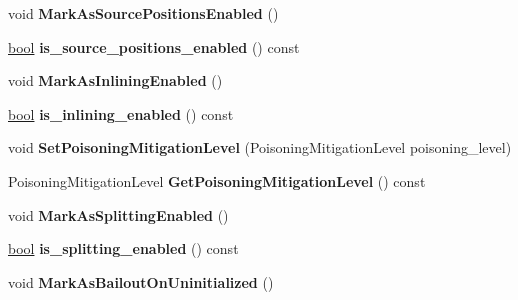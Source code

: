 \begin{DoxyCompactItemize}
void {\bfseries Mark\+As\+Source\+Positions\+Enabled} ()
\item 
\mbox{\label{classv8_1_1internal_1_1OptimizedCompilationInfo_aa2678065d4449bdbdda8e6f4bbad6d94}} 
\mbox{\hyperlink{classbool}{bool}} {\bfseries is\+\_\+source\+\_\+positions\+\_\+enabled} () const
\item 
\mbox{\label{classv8_1_1internal_1_1OptimizedCompilationInfo_a808c670437cd45d6b513de0625e955f2}} 
void {\bfseries Mark\+As\+Inlining\+Enabled} ()
\item 
\mbox{\label{classv8_1_1internal_1_1OptimizedCompilationInfo_af335802333f0660d4f3dd33f4a8811bb}} 
\mbox{\hyperlink{classbool}{bool}} {\bfseries is\+\_\+inlining\+\_\+enabled} () const
\item 
\mbox{\label{classv8_1_1internal_1_1OptimizedCompilationInfo_a2cccd688d4143e0a94428422c4895716}} 
void {\bfseries Set\+Poisoning\+Mitigation\+Level} (Poisoning\+Mitigation\+Level poisoning\+\_\+level)
\item 
\mbox{\label{classv8_1_1internal_1_1OptimizedCompilationInfo_ab9c47c4b7a997f6453f1d2ea5dfb75b9}} 
Poisoning\+Mitigation\+Level {\bfseries Get\+Poisoning\+Mitigation\+Level} () const
\item 
\mbox{\label{classv8_1_1internal_1_1OptimizedCompilationInfo_a37103012812652d843573c5f4e817392}} 
void {\bfseries Mark\+As\+Splitting\+Enabled} ()
\item 
\mbox{\label{classv8_1_1internal_1_1OptimizedCompilationInfo_af8407ff132336a69bdc547c716090c16}} 
\mbox{\hyperlink{classbool}{bool}} {\bfseries is\+\_\+splitting\+\_\+enabled} () const
\item 
\mbox{\label{classv8_1_1internal_1_1OptimizedCompilationInfo_a6077cfa94d2bc629395eaa42ad98d81f}} 
void {\bfseries Mark\+As\+Bailout\+On\+Uninitialized} ()
\item 

\end{DoxyCompactItemize}
